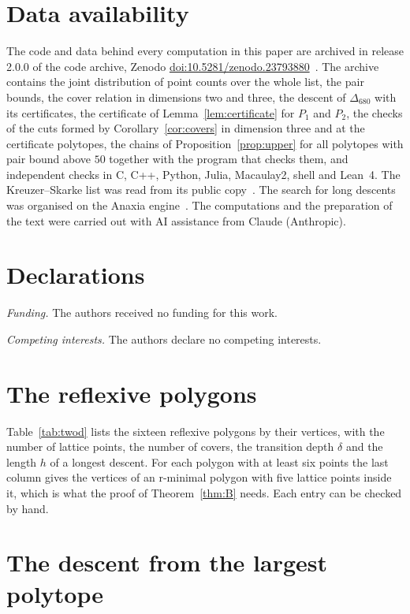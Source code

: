 \documentclass[11pt]{amsart}
\theoremstyle{definition}
\theoremstyle{remark}
\newcommand{\Dbig}{\Delta_{680}}
\newcommand{\UBs}{50}
\newcommand{\seedRelease}{2.0.0}
\newcommand{\seedDOI}{10.5281/zenodo.23793880}
\begin{document}
\section*{Data availability}

The code and data behind every computation in this paper are archived in
release \seedRelease{} of the code archive, Zenodo
\href{https://doi.org/\seedDOI}{doi:\seedDOI}~\cite{Repo}. The archive
contains the joint distribution of point counts over the whole list, the
pair bounds, the cover relation in dimensions two and three, the descent
of $\Dbig$ with its certificates, the certificate of
Lemma~\ref{lem:certificate} for $P_1$ and $P_2$, the checks of the cuts
formed by Corollary~\ref{cor:covers} in dimension three and at the
certificate polytopes, the chains of Proposition~\ref{prop:upper} for all
polytopes with pair bound above $\UBs$ together with the program that
checks them, and independent checks in C, C++, Python, Julia, Macaulay2,
shell and Lean~4. The Kreuzer--Skarke list was read from its public
copy~\cite{HF4D}. The search for long descents was organised on the Anaxia
engine~\cite{Ana26}. The computations and the preparation of the text were
carried out with AI assistance from Claude (Anthropic).

\section*{Declarations}

\noindent\textit{Funding.} The authors received no funding for this work.

\noindent\textit{Competing interests.} The authors declare no competing
interests.

\appendix

\section{The reflexive polygons}\label{app:twod}

Table~\ref{tab:twod} lists the sixteen reflexive polygons by their
vertices, with the number of lattice points, the number of covers, the
transition depth $\delta$ and the length $h$ of a longest descent. For each
polygon with at least six points the last column gives the vertices of an
r-minimal polygon with five lattice points inside it, which is what the
proof of Theorem~\ref{thm:B} needs. Each entry can be checked by hand.

\section{The descent from the largest polytope}\label{app:chain}
\end{document}
